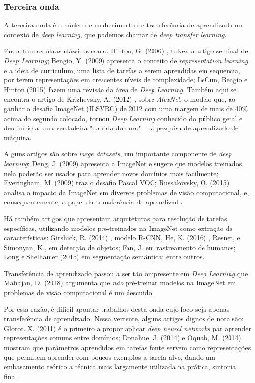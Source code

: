 \documentclass[sigconf]{acmart}
\begin{document}
\subsubsection{Terceira onda}\label{terceira_onda}
A terceira onda é o núcleo de conhecimento de transferência de aprendizado no contexto de \emph{deep learning}, que podemos chamar de \emph{deep transfer learning}. 

Encontramos obras clássicas como: Hinton, G. (2006) \cite{Hinton2006}, talvez o artigo seminal de \emph{Deep Learning}; Bengio, Y. (2009) \cite{Bengio2009} apresenta o conceito de \emph{representation learning} e a ideia de curriculum, uma lista de tarefas a serem aprendidas em sequencia, por terem representações em crescentes níveis de complexidade; LeCun, Bengio e Hinton (2015)\cite{LeCun2015} fazem uma revisão da área de \emph{Deep Learning}. Também aqui se encontra o artigo de Krizhevsky, A. (2012) \cite{alexnet}, sobre \emph{AlexNet}, o modelo que, ao ganhar o desafio ImageNet (ILSVRC) de 2012 com uma margem de mais de 40\% acima do segundo colocado, tornou \emph{Deep Learning} conhecido do público geral e deu início a uma verdadeira "corrida do ouro" ~na pesquisa de aprendizado de máquina. 

Alguns artigos são sobre \emph{large datasets}, um importante componente de \emph{deep learning}:  Deng, J. (2009) \cite{Deng2009} apresenta a ImageNet e sugere que modelos treinados nela poderão ser usados para aprender novos domínios mais facilmente; Everingham, M. (2009) \cite{Everingham2009} traz o desafio Pascal VOC; Russakovsky, O. (2015) \cite{Russakovsky2015} analisa o impacto da ImageNet em diversos problemas de visão computacional, e, consequentemente, o papel da transferência de aprendizado. 

Há também artigos que apresentam arquiteturas para resolução de tarefas específicas, utilizando modelos pre-treinados na ImageNet como extração de características: Girshick, R. (2014) \cite{Girshick2014}, modelo R-CNN, He, K. (2016) \cite{He2016}, Resnet, e Simonyan, K.\cite{simonyan2014very}, em detecção de objetos;  Fan, J. \cite{JialueFan2010} em rastreamento de humanos; Long e Shelhamer (2015) \cite{Long2015} em segmentação semântica; entre outros.

Transferência de aprendizado passou a ser tão onipresente em \emph{Deep Learning} que Mahajan, D. (2018) \cite{mahajan2018exploring} argumenta que \emph{não} pré-treinar modelos na ImageNet em problemas de visão computacional é um descuido.  

Por essa razão, é difícil apontar trabalhos desta onda cujo foco seja apenas transferência de aprendizado. Nessa vertente, alguns artigos dignos de nota são: Glorot, X. (2011) \cite{glorot2011domain} é o primeiro a propor aplicar \emph{deep neural networks} par aprender representações comuns entre domínios; Donahue, J. (2014)\cite{donahue2014decaf} e Oquab, M. (2014)\cite{Oquab:2014:LTM:2679600.2680210} mostram que parâmetros aprendidos em tarefas fonte servem como representações que permitem aprender com poucos exemplos a tarefa alvo, dando um embasamento teórico a técnica mais largamente utilizada na prática, sintonia fina. 
\end{document}
